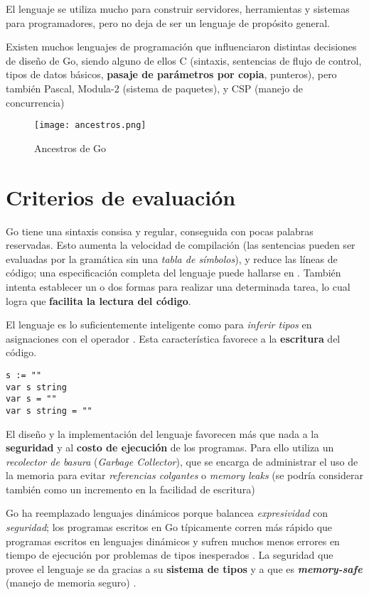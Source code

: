 El lenguaje se utiliza mucho para construir servidores, herramientas y sistemas para programadores, pero no deja de ser un lenguaje de propósito general.

Existen muchos lenguajes de programación que influenciaron distintas decisiones de diseño de Go, siendo alguno de ellos C (sintaxis, sentencias de flujo de control, tipos de datos básicos, \textbf{pasaje de parámetros por copia}, punteros), pero también Pascal, Modula-2 (sistema de paquetes), y CSP (manejo de concurrencia)

\begin{figure}[H]
    \centering
    \texttt{[image: ancestros.png]}
    \caption{Ancestros de Go \autocite{BookTheGoProgrammingLanguage}}
    \label{fig:name}
\end{figure}


\section{Criterios de evaluación}

Go tiene una sintaxis consisa y regular, conseguida con pocas palabras reservadas. Esto aumenta la velocidad de compilación (las sentencias pueden ser evaluadas por la gramática sin una \emph{tabla de símbolos}), y reduce las líneas de código; una especificación completa del lenguaje puede hallarse en \autocite{GolangSpec}. También intenta establecer un o dos formas para realizar una determinada tarea, lo cual logra que \textbf{facilita la lectura del código}.

El lenguaje es lo suficientemente inteligente como para \emph{inferir tipos} en asignaciones con el operador \dq{:=}. Esta característica favorece a la \textbf{escritura} del código.  

\begin{lstlisting}[title=Distintas formas de declarar una variable]
s := ""
var s string
var s = ""
var s string = ""
\end{lstlisting}

El diseño y la implementación del lenguaje favorecen más que nada a la \textbf{seguridad} y al \textbf{costo de ejecución} de los programas. Para ello utiliza un \emph{recolector de basura} (\emph{Garbage Collector}), que se encarga de administrar el uso de la memoria para evitar \emph{referencias colgantes} o \emph{memory leaks} (se podría considerar también como un incremento en la facilidad de escritura)   

Go ha reemplazado lenguajes dinámicos porque balancea \emph{expresividad} con \emph{seguridad}; los programas escritos en Go típicamente corren más rápido que programas escritos en lenguajes dinámicos y sufren muchos menos errores en tiempo de ejecución por problemas de tipos inesperados \autocite{BookTheGoProgrammingLanguage}. La seguridad que provee el lenguaje se da gracias a su \textbf{sistema de tipos} y a que es \textbf{\emph{memory-safe}} (manejo de memoria seguro) \autocite{TheGoProgrammingLanguage}. 

